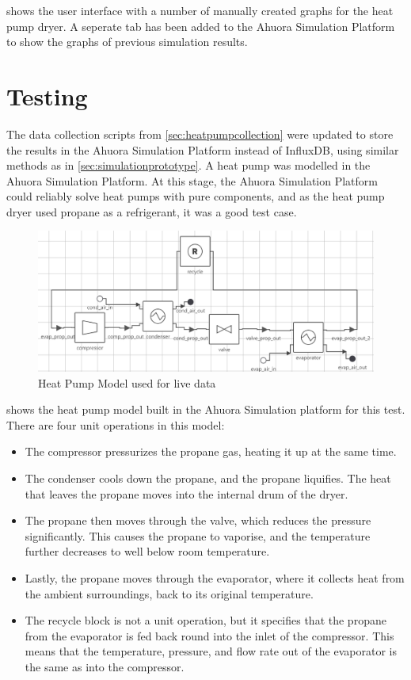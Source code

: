 shows the user interface with a number of manually created graphs for the heat pump dryer. A seperate tab has been added to the Ahuora Simulation Platform to show the graphs of previous simulation results. 


\section{Testing}

The data collection scripts from \cref{sec:heatpumpcollection} were updated to store the results in the Ahuora Simulation Platform instead of InfluxDB, using similar methods as in \cref{sec:simulationprototype}. A heat pump was modelled in the Ahuora Simulation Platform. At this stage, the Ahuora Simulation Platform could reliably solve heat pumps with pure components, and as the heat pump dryer used propane as a refrigerant, it was a good test case. 


\begin{figure}
    \centering
    \includegraphics[width=\textwidth]{heatpumpmodel.png}
    \caption{Heat Pump Model used for live data}
    \label{fig:heatpumpmodel}
\end{figure}

 shows the heat pump model built in the Ahuora Simulation platform for this test. There are four unit operations in this model:

\begin{itemize}
    \item The compressor pressurizes the propane gas, heating it up at the same time. 
    \item The condenser cools down the propane, and the propane liquifies. The heat that leaves the propane moves into the internal drum of the dryer.
    \item The propane then moves through the valve, which reduces the pressure significantly. This causes the propane to vaporise, and the temperature further decreases to well below room temperature.
    \item Lastly, the propane moves through the evaporator, where it collects heat from the ambient surroundings, back to its original temperature.
    \item The recycle block is not a unit operation, but it specifies that the propane from the evaporator is fed back round into the inlet of the compressor. This means that the temperature, pressure, and flow rate out of the evaporator is the same as into the compressor.
\end{itemize}

